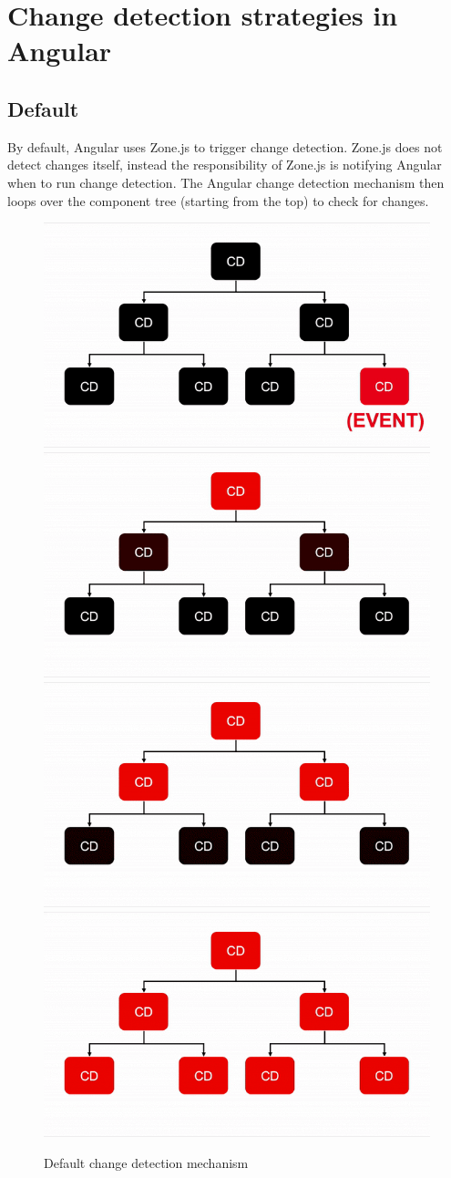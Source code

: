 \section{Change detection strategies in Angular}
\subsection{Default}
By default, Angular uses Zone.js to trigger change detection. Zone.js does not detect changes itself, instead the responsibility of Zone.js is notifying Angular when to run change detection. \autocite{Inatomi2020} The Angular change detection mechanism then loops over the component tree (starting from the top) to check for changes.
\begin{figure}[h!]
    \caption{Default change detection mechanism}
    \centering
    \includegraphics[width=.49\textwidth]{img/cycle1.png} 
    \includegraphics[width=.49\textwidth]{img/cycle2.png} 
    \includegraphics[width=.49\textwidth]{img/cycle3.png} 
    \includegraphics[width=.49\textwidth]{img/cycle4.png} 
\end{figure}

